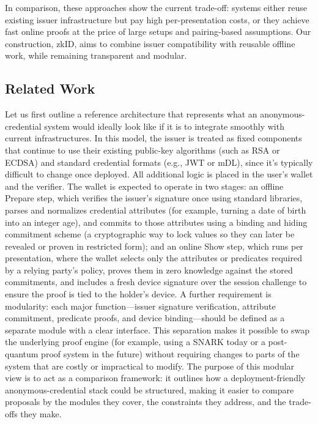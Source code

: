 In comparison, these approaches show the current trade-off: systems either reuse existing issuer infrastructure but pay high per-presentation costs, or they achieve fast online proofs at the price of large setups and pairing-based assumptions. Our construction, zkID, aims to combine issuer compatibility with reusable offline work, while remaining transparent and modular.

\subsection{Related Work}
Let us first outline a reference architecture that represents what an anonymous-credential system would ideally look like if it is to integrate smoothly with current infrastructures. In this model, the issuer is treated as fixed components that continue to use their existing public-key algorithms (such as RSA or ECDSA) and standard credential formats (e.g., JWT or mDL), since it's typically difficult to change once deployed. All additional logic is placed in the user’s wallet and the verifier.
The wallet is expected to operate in two stages: an offline Prepare step, which verifies the issuer’s signature once using standard libraries, parses and normalizes credential attributes (for example, turning a date of birth into an integer age), and commits to those attributes using a binding and hiding commitment scheme (a cryptographic way to lock values so they can later be revealed or proven in restricted form); and an online Show step, which runs per presentation, where the wallet selects only the attributes or predicates required by a relying party’s policy, proves them in zero knowledge against the stored commitments, and includes a fresh device signature over the session challenge to ensure the proof is tied to the holder’s device.
A further requirement is modularity: each major function---issuer signature verification, attribute commitment, predicate proofs, and device binding---should be defined as a separate module with a clear interface. This separation makes it possible to swap the underlying proof engine (for example, using a SNARK today or a post-quantum proof system in the future) without requiring changes to parts of the system that are costly or impractical to modify. The purpose of this modular view is to act as a comparison framework: it outlines how a deployment-friendly anonymous-credential stack could be structured, making it easier to compare proposals by the modules they cover, the constraints they address, and the trade-offs they make.

